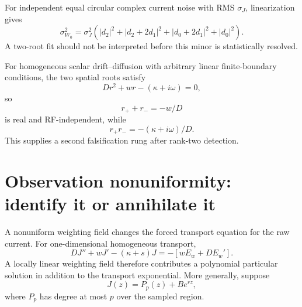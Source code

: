 \documentclass[11pt]{article}
\begin{document}
For independent equal circular complex current noise with RMS $\sigma_J$, linearization gives
\begin{equation}
\sigma_{W_0}^2=\sigma_J^2\left(|d_2|^2+|d_2+2d_1|^2+|d_0+2d_1|^2+|d_0|^2\right).
\label{eq:Wnoise}
\end{equation}
A two-root fit should not be interpreted before this minor is statistically resolved.

For homogeneous scalar drift--diffusion with arbitrary linear finite-boundary conditions, the two spatial roots satisfy
\begin{equation}
D r^2+w r-(\kappa+i\omega)=0,
\end{equation}
so
\begin{equation}
\boxed{r_++r_-=-w/D}
\label{eq:rootsum}
\end{equation}
is real and RF-independent, while
\begin{equation}
\boxed{r_+r_-=-(\kappa+i\omega)/D.}
\end{equation}
This supplies a second falsification rung after rank-two detection.

\section{Observation nonuniformity: identify it or annihilate it}
A nonuniform weighting field changes the forced transport equation for the raw current. For one-dimensional homogeneous transport,
\begin{equation}
D J''+wJ'-(\kappa+s)J=-[wE_w+D E_w'].
\label{eq:forcedJ}
\end{equation}
A locally linear weighting field therefore contributes a polynomial particular solution in addition to the transport exponential. More generally, suppose
\begin{equation}
\boxed{J(z)=P_p(z)+B e^{rz},}
\label{eq:polyexp}
\end{equation}
where $P_p$ has degree at most $p$ over the sampled region.
\end{document}
